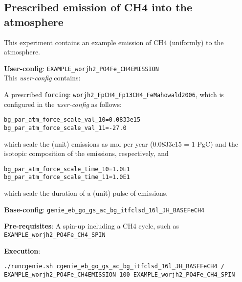 \documentclass[10pt,twoside]{article}
\begin{document}

\subsection{Prescribed emission of CH4 into the atmosphere}\label{EXAMPLE_worjh2_PO4Fe_CH4EMISSION}

This experiment contains an example emission of CH4 (uniformly) to the atmosphere.

\noindent \textbf{User-config}: \texttt{EXAMPLE\_worjh2\_PO4Fe\_CH4EMISSION}
\\ This \textit{user-config} contains:
\begin{compactitem}
        \item A prescribed \texttt{forcing}: \texttt{worjh2\_FpCH4\_Fp13CH4\_FeMahowald2006}, which is configured in the \textit{user-config} as follows:
\begin{compactenum}
        \item 
        \begin{verbatim}
bg_par_atm_force_scale_val_10=0.0833e15
bg_par_atm_force_scale_val_11=-27.0
                \end{verbatim}
                which scale the (unit) emissions as mol per year (0.0833e15 = 1 PgC) and the isotopic composition of the emissions, respectively, and
        \item 
        \begin{verbatim}
bg_par_atm_force_scale_time_10=1.0E1
bg_par_atm_force_scale_time_11=1.0E1
                \end{verbatim}
                which scale the duration of a (unit) pulse of emissions.
\end{compactenum}
\end{compactitem}

\noindent \textbf{Base-config}: \texttt{genie\_eb\_go\_gs\_ac\_bg\_itfclsd\_16l\_JH\_BASEFeCH4}

\noindent \textbf{Pre-requisites}: A spin-up including a CH4 cycle, such as \texttt{EXAMPLE\_worjh2\_PO4Fe\_CH4\_SPIN}

\noindent \textbf{Execution}:
\vspace{-5pt}\begin{verbatim}
./runcgenie.sh cgenie_eb_go_gs_ac_bg_itfclsd_16l_JH_BASEFeCH4 / 
EXAMPLE_worjh2_PO4Fe_CH4EMISSION 100 EXAMPLE_worjh2_PO4Fe_CH4_SPIN
                \end{verbatim}\vspace{-5pt}
\end{document}
